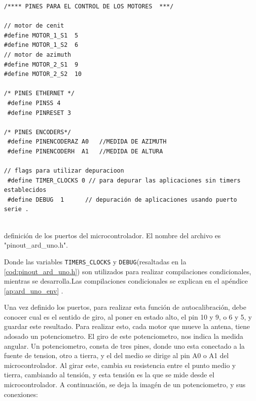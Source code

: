 \begin{listing}[ht]

	\begin{verbatim}
/**** PINES PARA EL CONTROL DE LOS MOTORES  ***/
		
// motor de cenit 
#define MOTOR_1_S1  5
#define MOTOR_1_S2  6
// motor de azimuth 
#define MOTOR_2_S1  9 
#define MOTOR_2_S2  10 
		
/* PINES ETHERNET */
 #define PINSS 4
 #define PINRESET 3  
		
/* PINES ENCODERS*/
 #define PINENCODERAZ A0   //MEDIDA DE AZIMUTH 
 #define PINENCODERH  A1   //MEDIDA DE ALTURA 
		
// flags para utilizar depuracioon 
 #define TIMER_CLOCKS 0 // para depurar las aplicaciones sin timers establecidos  
 #define DEBUG  1      // depuración de aplicaciones usando puerto serie .  
		
\end{verbatim}
	\vspace{-5mm}
	\caption{definición de los puertos del microcontrolador. El nombre del archivo es "pinout\_ard\_uno.h".}
	\label{cod:pinout_ard_uno.h} 
\end{listing}
Donde las variables \texttt{TIMERS_CLOCKS} y \texttt{DEBUG}(resaltadas en la \ref{cod:pinout_ard_uno.h}) son utilizados para realizar compilaciones condicionales, mientras se desarrolla.Las compilaciones condicionales se explican en el apéndice \ref{ap:ard_uno_env} .
 
Una vez definido los puertos, para realizar esta función de autocalibración, debe conocer cual es el sentido de giro, al poner en estado alto, el pin 10 y 9, o 6 y 5, y guardar este resultado. Para realizar esto, cada motor que mueve la antena, tiene adosado un potenciometro. El giro de este potenciometro, nos indica la medida angular. Un potenciometro, consta de tres pines, donde uno esta conectado a la fuente de tension, otro a tierra, y el del medio se dirige al pin A0 o A1 del microcontrolador. Al girar este, cambia su resistencia entre el punto medio y tierra, cambiando al tensión, y esta tensión es la que se mide desde el microcontrolador. A continuación, se deja la imagén de un potenciometro, y sus conexiones: 

